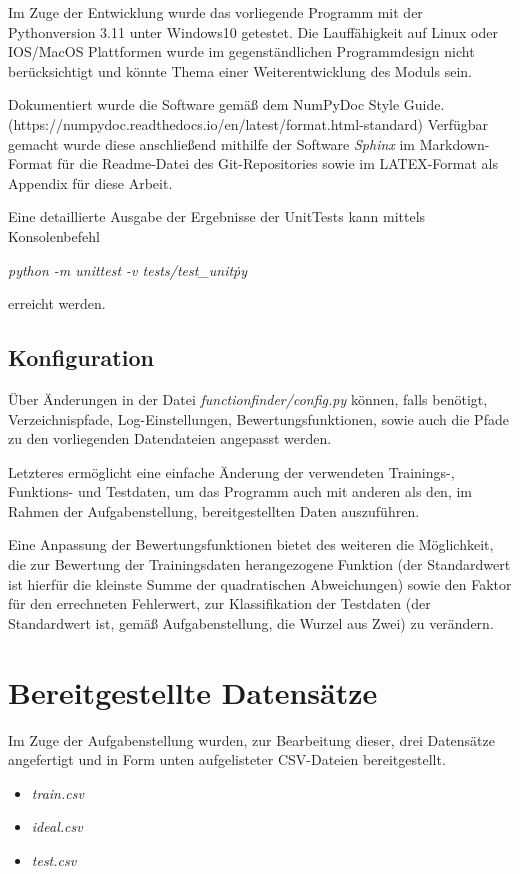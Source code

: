 Im Zuge der Entwicklung wurde das vorliegende Programm mit der Pythonversion 3.11 unter Windows10 getestet. Die Lauffähigkeit auf Linux oder IOS/MacOS Plattformen wurde im gegenständlichen Programmdesign nicht berücksichtigt und könnte Thema einer Weiterentwicklung des Moduls sein.

Dokumentiert wurde die Software gemäß dem NumPyDoc Style Guide. (https://numpydoc.readthedocs.io/en/latest/format.html-standard) Verfügbar gemacht wurde diese anschließend mithilfe der Software \emph{Sphinx} im Markdown-Format für die Readme-Datei des Git-Repositories sowie im LATEX-Format als Appendix für diese Arbeit.

Eine detaillierte Ausgabe der Ergebnisse der UnitTests kann mittels Konsolenbefehl
\begin{center}
\emph{python -m unittest -v tests/test\_unit\.py}
\end{center}
erreicht werden. 

\subsection{Konfiguration}

Über Änderungen in der Datei \emph{functionfinder/config.py} können, falls benötigt, Verzeichnispfade, Log-Einstellungen, Bewertungsfunktionen, sowie auch die Pfade zu den vorliegenden Datendateien angepasst werden.

Letzteres ermöglicht eine einfache Änderung der verwendeten Trainings-, Funktions- und Testdaten, um das Programm auch mit anderen als den, im Rahmen der Aufgabenstellung, bereitgestellten Daten auszuführen.

Eine Anpassung der Bewertungsfunktionen bietet des weiteren die Möglichkeit, die zur Bewertung der Trainingsdaten herangezogene Funktion (der Standardwert ist hierfür die kleinste Summe der quadratischen Abweichungen) sowie den Faktor für den errechneten Fehlerwert, zur Klassifikation der Testdaten (der Standardwert ist, gemäß Aufgabenstellung, die Wurzel aus Zwei) zu verändern.

\section{Bereitgestellte Datensätze}

Im Zuge der Aufgabenstellung wurden, zur Bearbeitung dieser, drei Datensätze angefertigt und in Form unten aufgelisteter CSV-Dateien bereitgestellt.

\begin{itemize}
 \itemsep0pt
 \item \emph{train.csv}
 \item \emph{ideal.csv}
 \item \emph{test.csv}
\end{itemize}

